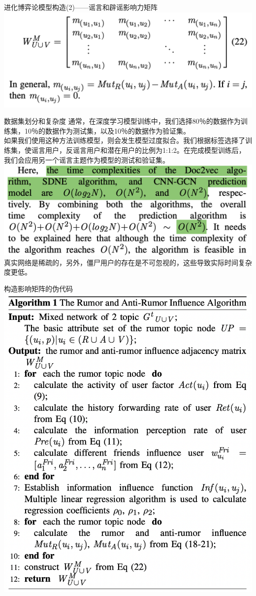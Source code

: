 \documentclass{beamer}
\begin{document}
\begin{frame}{进化博弈论模型构造(2)——谣言和辟谣影响力矩阵}
	\includegraphics[width=0.8\linewidth]{Assets/进化博弈论-2.png}
\end{frame}

\begin{frame}{数据集划分和复杂度}
	通常，在深度学习模型训练中，我们选择80％的数据作为训练集，10％的数据作为测试集，以及10％的数据作为验证集。\\
	如果我们使用这种方法训练模型，则会发生模型过度拟合。我们根据标签选择了训练集，使谣言用户，反谣言用户和潜在用户的比例为1:1:2。在完成模型训练后，我们会应用另一个谣言主题作为模型的测试和验证集。\\
	\includegraphics[width=0.8\linewidth]{Assets/时间复杂度.png}\\
	真实网络是稀疏的，另外，僵尸用户的存在是不可忽视的，这些导致实际时间复杂度更低。
\end{frame}

\begin{frame}{构造影响矩阵的伪代码}
	\includegraphics[width=0.6\linewidth]{Assets/算法1.png}
\end{frame}
\end{document}
